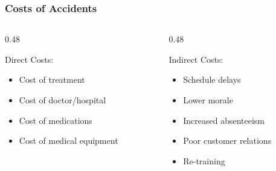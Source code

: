 \begin{frame}
    \frametitle{Costs of Accidents}

    \begin{columns}[t]
        \begin{column}{0.48\linewidth}
            \begin{block}{Direct Costs:}
                \begin{itemize}[<+- | alert@+>]
                    \item Cost of treatment
                    \item Cost of doctor/hospital
                    \item Cost of medications
                    \item Cost of medical equipment
                \end{itemize}
            \end{block}
        \end{column}
        \begin{column}{0.48\linewidth}
            \begin{block}{Indirect Costs:}
                \begin{itemize}[<+- | alert@+>]
                    \item Schedule delays
                    \item Lower morale
                    \item Increased absenteeism
                    \item Poor customer relations
                    \item Re-training
                \end{itemize}
            \end{block}
        \end{column}
    \end{columns}
\end{frame}

